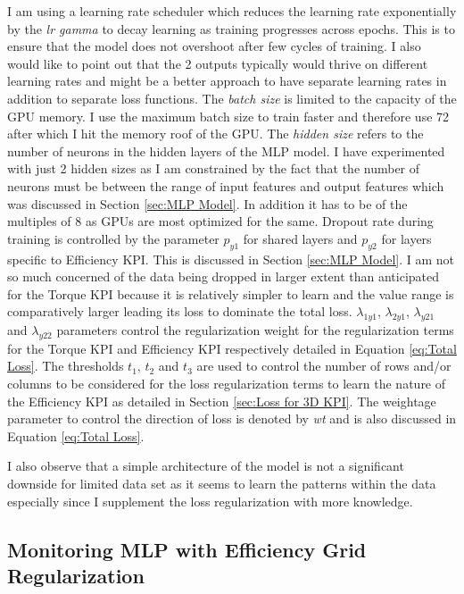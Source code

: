 \documentclass{report} %
\begin{document}
I am using a learning rate scheduler which reduces the learning rate exponentially by the \textit{lr gamma} to decay learning as training progresses across epochs.
This is to ensure that the model does not overshoot after few cycles of training.
I also would like to point out that the 2 outputs typically would thrive on different learning rates and might be a better approach to have separate learning rates in addition 
to separate loss functions.
The \textit{batch size} is limited to the capacity of the \ac{GPU} memory. I use the maximum batch size to train faster and therefore use 72 after which I hit the 
memory roof of the GPU.
The \textit{hidden size} refers to the number of neurons in the hidden layers of the \ac{MLP} model. I have experimented with just 2 hidden sizes as I am 
constrained by the fact that the number of neurons must be between the range of input features and output features which was discussed in Section \ref{sec:MLP Model}.
In addition it has to be of the multiples of 8 as \ac{GPU}s are most optimized for the same.
Dropout rate during training is controlled by the parameter \textit{$p_{y1}$} for shared layers and \textit{$p_{y2}$} for layers specific to Efficiency \ac{KPI}. 
This is discussed in Section \ref{sec:MLP Model}. I am not so much concerned of the data being dropped in larger extent than anticipated for the Torque \ac{KPI} 
because it is relatively simpler to learn and the value range is comparatively larger leading its loss to dominate the total loss.
\textit{$\lambda_{1y1}$}, \textit{$\lambda_{2y1}$}, \textit{$\lambda_{y21}$} and \textit{$\lambda_{y22}$} parameters control the regularization weight for the 
regularization terms for the Torque \ac{KPI} and Efficiency \ac{KPI} respectively detailed in Equation \ref{eq:Total Loss}.
The thresholds \textit{$t_{1}$}, \textit{$t_{2}$} and \textit{$t_{3}$} are used to control the number of rows and/or columns to be considered for the loss
regularization terms to learn the nature of the Efficiency \ac{KPI} as detailed in Section \ref{sec:Loss for 3D KPI}.
The weightage parameter to control the direction of loss is denoted by \textit{wt} and is also discussed in Equation \ref{eq:Total Loss}.

I also observe that a simple architecture of the model is not a significant downside for limited data set as it seems to learn the patterns within the data 
especially since I supplement the loss regularization with more knowledge.

\subsection{Monitoring MLP with Efficiency Grid Regularization}\label{subsec:Monitoring MLP with Efficiency Grid Regularization}
\end{document}
